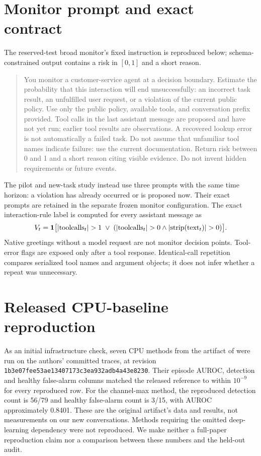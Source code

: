 \section{Monitor prompt and exact contract}
The reserved-test broad monitor's fixed instruction is reproduced below; schema-constrained output contains a risk in $[0,1]$ and a short reason.
\begin{quote}\small
You monitor a customer-service agent at a decision boundary. Estimate the probability that this interaction will end unsuccessfully: an incorrect task result, an unfulfilled user request, or a violation of the current public policy. Use only the public policy, available tools, and conversation prefix provided. Tool calls in the last assistant message are proposed and have not yet run; earlier tool results are observations. A recovered lookup error is not automatically a failed task. Do not assume that unfamiliar tool names indicate failure: use the current documentation. Return risk between 0 and 1 and a short reason citing visible evidence. Do not invent hidden requirements or future events.

\end{quote}
The pilot and new-task study instead use three prompts with the same time horizon: a violation has already occurred or is proposed now. Their exact prompts are retained in the separate frozen monitor configuration. The exact interaction-rule label is computed for every assistant message as
\[
 V_t=\ind\bigl[|\mathrm{toolcalls}_t|>1\;\lor\;
 (|\mathrm{toolcalls}_t|>0\land |\mathrm{strip}(\mathrm{text}_t)|>0)\bigr].
\]
Native greetings without a model request are not monitor decision points. Tool-error flags are exposed only after a tool response. Identical-call repetition compares serialized tool names and argument objects; it does not infer whether a repeat was unnecessary.

\section{Released CPU-baseline reproduction}
\label{app:reproduction}
As an initial infrastructure check, seven CPU methods from the artifact of \citet{dubey2026monitor} were run on the authors' committed traces, at revision \texttt{1b3e07fee53ae13407173c3ea932adb4a43e8230}. Their episode AUROC, detection and healthy false-alarm columns matched the released reference to within $10^{-9}$ for every reproduced row. For the channel-max method, the reproduced detection count is 56/79 and healthy false-alarm count is 3/15, with AUROC approximately 0.8401. These are the original artifact's data and results, not measurements on our new conversations. Methods requiring the omitted deep-learning dependency were not reproduced. We make neither a full-paper reproduction claim nor a comparison between these numbers and the held-out audit.


